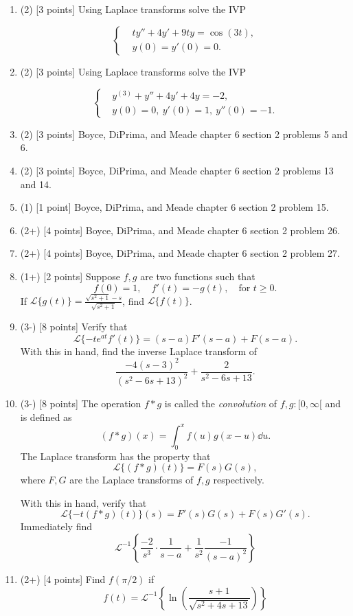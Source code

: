 \documentclass[12pt]{article}
\newcommand{\cL}{\mathcal{L}}
\begin{document}
\begin{enumerate}
    \item (2) [3 points] Using Laplace transforms solve the IVP
   
   \[
   \left\lbrace
   \begin{aligned}
      &ty''+4y'+9ty=\cos(3t),\\
      &y(0)=y'(0)=0.
   \end{aligned}
   \right.
   \]

     \item (2) [3 points] Using Laplace transforms solve the IVP
   
   \[
   \left\lbrace
   \begin{aligned}
      &y^{(3)}+y''+4y'+4y=-2,\\
      &y(0)=0,\ y'(0)=1,\ y''(0)=-1.
   \end{aligned}
   \right.
   \]

   \item (2) [3 points] Boyce, DiPrima, and Meade chapter 6 section 2 problems 5 and 6.
   
   \item (2) [3 points] Boyce, DiPrima, and Meade chapter 6 section 2 problems 13 and 14.
   
   \item (1) [1 point] Boyce, DiPrima, and Meade chapter 6 section 2 problem 15.
   
   \item (2+) [4 points] Boyce, DiPrima, and Meade chapter 6 section 2 problem 26.
   
   \item (2+) [4 points] Boyce, DiPrima, and Meade chapter 6 section 2 problem 27.

   \item (1+) [2 points] Suppose \(f,g\) are two functions such that 
   \[
      f(0)=1,\quad f'(t)=-g(t),\quad\text{for }t\geq 0. 
   \]
   If \(\cL\lbrace g(t)\rbrace=\frac{\sqrt{s^2+1}-s}{\sqrt{s^2+1}}\), find \(\cL\lbrace f(t)\rbrace\). 

   \item (3-) [8 points] Verify that 
   \[
   \cL\lbrace -te^{at}f'(t)\rbrace = (s-a)F'(s-a)+F(s-a).
   \]
   With this in hand, find the inverse Laplace transform of 
   \[
   \frac{-4(s-3)^2}{(s^2-6s+13)^2}+\frac{2}{s^2-6s+13}.
   \]

   \item (3-) [8 points] The operation \(f\ast g\) is called the \emph{convolution} of \(f,g:[0,\infty[\) and is defined as 
   \[
      (f\ast g)(x)=\int_0^x f(u)g(x-u)\dd u.
   \]
   The Laplace transform has the property that 
   \[
   \cL\lbrace (f\ast g)(t)\rbrace = F(s)G(s),
   \]
   where \(F,G\) are the Laplace transforms of \(f,g\) respectively.\par
   With this in hand, verify that
   \[
   \cL\lbrace -t(f\ast g)(t)\rbrace(s)=F'(s)G(s)+F(s)G'(s).
   \]
   Immediately find 
   \[
   \cL^{-1}\left\lbrace\frac{-2}{s^3}\cdot\frac{1}{s-a}+\frac{1}{s^2}\frac{-1}{(s-a)^2}\right\rbrace
   \]
   
   \item (2+) [4 points] Find \(f(\pi/2)\) if 
   \[
   f(t)=\cL^{-1}\left\lbrace\ln\left(\frac{s+1}{\sqrt{s^2+4s+13}}\right)\right\rbrace
   \]
\end{enumerate}
\end{document}

